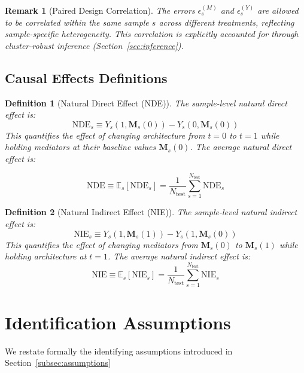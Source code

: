 \documentclass[
    reprint,
    amsmath, amssymb,
    aps,
    floatfix,
    nofootinbib
]{revtex4-1}
\newtheorem{definition}{Definition}
\newtheorem{remark}{Remark}
\begin{document}
\begin{remark}[Paired Design Correlation]
The errors $\epsilon_s^{(M)}$ and $\epsilon_s^{(Y)}$ are allowed to be correlated within the same sample $s$ across different treatments, reflecting sample-specific heterogeneity. This correlation is explicitly accounted for through cluster-robust inference (Section~\ref{sec:inference}).
\end{remark}

\subsection{Causal Effects Definitions}

\begin{definition}[Natural Direct Effect (NDE)]
The sample-level natural direct effect is:
\begin{equation}
    \text{NDE}_s \equiv Y_s(1, \bm{M}_s(0)) - Y_s(0, \bm{M}_s(0))
\end{equation}
This quantifies the effect of changing architecture from $t=0$ to $t=1$ while holding mediators at their baseline values $\bm{M}_s(0)$. The average natural direct effect is:

\begin{equation}
    \text{NDE} \equiv \mathbb{E}_s[\text{NDE}_s] = \frac{1}{N_{\text{test}}} \sum_{s=1}^{N_{\text{test}}} \text{NDE}_s
\end{equation}

\end{definition}

\begin{definition}[Natural Indirect Effect (NIE)]
The sample-level natural indirect effect is:
\begin{equation}
    \text{NIE}_s \equiv Y_s(1, \bm{M}_s(1)) - Y_s(1, \bm{M}_s(0))
\end{equation}
This quantifies the effect of changing mediators from $\bm{M}_s(0)$ to $\bm{M}_s(1)$ while holding architecture at $t=1$. The average natural indirect effect is:
\begin{equation}
    \text{NIE} \equiv \mathbb{E}_s[\text{NIE}_s] = \frac{1}{N_{\text{test}}} \sum_{s=1}^{N_{\text{test}}} \text{NIE}_s
\end{equation}

\end{definition}

\section{Identification Assumptions}
We restate formally the identifying assumptions introduced in Section~\ref{subsec:assumptions}
\end{document}
